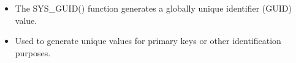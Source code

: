 \setlength{\columnsep}{3pt}
\begin{flushleft}

	\begin{itemize}
		\item The SYS\_GUID() function generates a globally unique identifier (GUID) value. 
		\item Used to generate unique values for primary keys or other identification purposes.
		\bigskip
	\end{itemize}
	
\end{flushleft}

